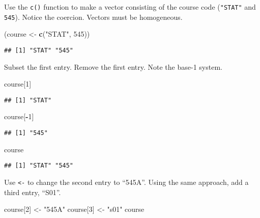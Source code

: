 \documentclass[]{article}
\newenvironment{Shaded}{\begin{snugshade}}{\end{snugshade}}
\newcommand{\KeywordTok}[1]{\textcolor[rgb]{0.13,0.29,0.53}{\textbf{#1}}}
\newcommand{\DecValTok}[1]{\textcolor[rgb]{0.00,0.00,0.81}{#1}}
\newcommand{\StringTok}[1]{\textcolor[rgb]{0.31,0.60,0.02}{#1}}
\newcommand{\OperatorTok}[1]{\textcolor[rgb]{0.81,0.36,0.00}{\textbf{#1}}}
\newcommand{\NormalTok}[1]{#1}
\begin{document}
Use the \texttt{c()} function to make a vector consisting of the course
code (\texttt{"STAT"} and \texttt{545}). Notice the coercion. Vectors
must be homogeneous.

\begin{Shaded}
\begin{Highlighting}[]
\NormalTok{(course <-}\StringTok{ }\KeywordTok{c}\NormalTok{(}\StringTok{"STAT"}\NormalTok{, }\DecValTok{545}\NormalTok{))}
\end{Highlighting}
\end{Shaded}

\begin{verbatim}
## [1] "STAT" "545"
\end{verbatim}

Subset the first entry. Remove the first entry. Note the base-1 system.

\begin{Shaded}
\begin{Highlighting}[]
\NormalTok{course[}\DecValTok{1}\NormalTok{]}
\end{Highlighting}
\end{Shaded}

\begin{verbatim}
## [1] "STAT"
\end{verbatim}

\begin{Shaded}
\begin{Highlighting}[]
\NormalTok{course[}\OperatorTok{-}\DecValTok{1}\NormalTok{]}
\end{Highlighting}
\end{Shaded}

\begin{verbatim}
## [1] "545"
\end{verbatim}

\begin{Shaded}
\begin{Highlighting}[]
\NormalTok{course}
\end{Highlighting}
\end{Shaded}

\begin{verbatim}
## [1] "STAT" "545"
\end{verbatim}

Use \texttt{\textless{}-} to change the second entry to ``545A''. Using
the same approach, add a third entry, ``S01''.

\begin{Shaded}
\begin{Highlighting}[]
\NormalTok{course[}\DecValTok{2}\NormalTok{] <-}\StringTok{ "545A"}
\NormalTok{course[}\DecValTok{3}\NormalTok{] <-}\StringTok{ "s01"}
\NormalTok{course}
\end{Highlighting}
\end{Shaded}
\end{document}
